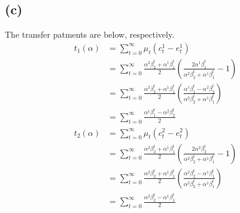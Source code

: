 \documentclass[a4paper]{article}
\begin{document}
\subsection*{(c)}
The transfer patments are below, respectively.
\begin{align*}
    t_1 (\alpha)
    &= \sum_{t=0}^{\infty} \mu_t (c_t^1 - e_t^1)\\
    &= \sum_{t=0}^{\infty} \frac{\alpha^2 \beta_2^t + \alpha^1 \beta_1^t}{2} \left(\frac{2 \alpha^1 \beta_1^t}{\alpha^2 \beta_2^t + \alpha^1 \beta_1^t} - 1\right)\\
    &= \sum_{t=0}^{\infty} \frac{\alpha^2 \beta_2^t + \alpha^1 \beta_1^t}{2} \left(\frac{\alpha^1 \beta_1^t - \alpha^2 \beta_2^t}{\alpha^2 \beta_2^t + \alpha^1 \beta_1^t}\right)\\
    &= \sum_{t=0}^{\infty} \frac{\alpha^1 \beta_1^t - \alpha^2 \beta_2^t}{2}
\end{align*}
\begin{align*}
    t_2 (\alpha)
    &= \sum_{t=0}^{\infty} \mu_t (c_t^2 - e_t^2)\\
    &= \sum_{t=0}^{\infty} \frac{\alpha^2 \beta_2^t + \alpha^1 \beta_1^t}{2} \left(\frac{2 \alpha^2 \beta_2^t}{\alpha^2 \beta_2^t + \alpha^1 \beta_1^t} - 1\right)\\
    &= \sum_{t=0}^{\infty} \frac{\alpha^2 \beta_2^t + \alpha^1 \beta_1^t}{2} \left(\frac{\alpha^2 \beta_2^t - \alpha^1 \beta_1^t}{\alpha^2 \beta_2^t + \alpha^1 \beta_1^t}\right)\\
    &= \sum_{t=0}^{\infty} \frac{\alpha^2 \beta_2^t - \alpha^1 \beta_1^t}{2}
\end{align*}
\end{document}

